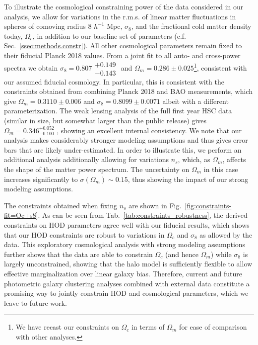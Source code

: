 \documentclass[a4paper,11pt]{article}
\begin{document}
    To illustrate the cosmological constraining power of the data considered in our analysis, we allow for variations in the r.m.s. of linear matter fluctuations in spheres of comoving radius 8 $h^{-1}$ Mpc, $\sigma_{8}$, and the fractional cold matter density today, $\Omega_{c}$, in addition to our baseline set of parameters (c.f. Sec.~\ref{ssec:methods.constr}). All other cosmological parameters remain fixed to their fiducial Planck 2018 values. From a joint fit to all auto- and cross-power spectra we obtain $\sigma_{8} = 0.807\substack{+0.149 \\ -0.143}$ and $\Omega_{m} = 0.286 \pm 0.025$\footnote{We have recast our constraints on $\Omega_{c}$ in terms of $\Omega_{m}$ for ease of comparison with other analyses.},
    consistent with our assumed fiducial cosmology.  In particular, this is consistent with the constraints obtained from combining Planck 2018 and BAO measurements, which give $\Omega_m=0.3110\pm 0.006$ and $\sigma_8=0.8099 \pm 0.0071$ \cite{Planck:2018} albeit with a different parameterization. The weak lensing analysis of the full first year HSC data (similar in size, but somewhat larger than the public release) gives $\Omega_m=0.346^{+0.052}_{-0.100}$ \cite{1906.06041}, showing an excellent internal consistency. We note that our analysis makes considerably stronger modeling assumptions and thus gives error bars that are likely under-estimated. In order to illustrate this, we perform an additional analysis additionally allowing for variations $n_{s}$, which, as $\Omega_{m}$, affects the shape of the matter power spectrum. The uncertainty on $\Omega_{m}$ in this case increases significantly to $\sigma(\Omega_{m}) \sim 0.15$, thus showing the impact of our strong modeling assumptions.

    The constraints obtained when fixing $n_{s}$ are shown in Fig.~\ref{fig:constraints-fit=Oc+s8}. As can be seen from Tab.~\ref{tab:constraints_robustness}, the derived constraints on HOD parameters agree well with our fiducial results, which shows that our HOD constraints are robust to variations in $\Omega_{c}$ and $\sigma_{8}$ as allowed by the data. This exploratory cosmological analysis with strong modeling assumptions further shows that the data are able to constrain $\Omega_{c}$ (and hence $\Omega_{m}$) while $\sigma_{8}$ is largely unconstrained, showing that the halo model is sufficiently flexible to allow effective marginalization over linear galaxy bias. Therefore, current and future photometric galaxy clustering analyses combined with external data constitute a promising way to jointly constrain HOD and cosmological parameters, which we leave to future work. 
 
\end{document}
